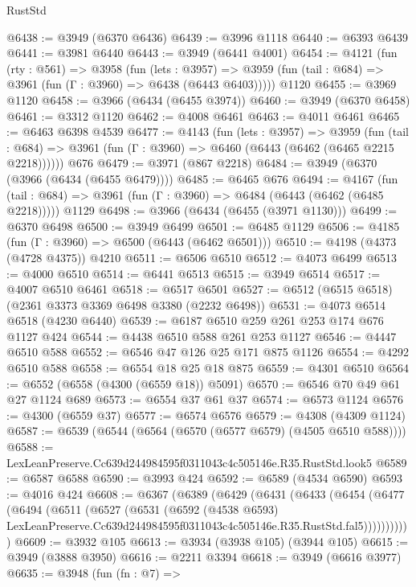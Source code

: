 \begin{lexlean}{RustStd}
\begin{coremodule}
@6438 := @3949 (@6370 @6436)
@6439 := @3996 @1118
@6440 := @6393 @6439
@6441 := @3981 @6440
@6443 := @3949 (@6441 @4001)
@6454 := @4121
    (fun (rty : @561) =>
    @3958
      (fun (lets : @3957) =>
      @3959 (fun (tail : @684) => @3961 (fun (Γ : @3960) => @6438 (@6443 @6403)))))
    @1120
@6455 := @3969 @1120
@6458 := @3966 (@6434 (@6455 @3974))
@6460 := @3949 (@6370 @6458)
@6461 := @3312 @1120
@6462 := @4008 @6461
@6463 := @4011 @6461
@6465 := @6463 @6398 @4539
@6477 := @4143
    (fun (lets : @3957) =>
    @3959
      (fun (tail : @684) => @3961 (fun (Γ : @3960) => @6460 (@6443 (@6462 (@6465 @2215 @2218))))))
    @676
@6479 := @3971 (@867 @2218)
@6484 := @3949 (@6370 (@3966 (@6434 (@6455 @6479))))
@6485 := @6465 @676
@6494 := @4167
    (fun (tail : @684) => @3961 (fun (Γ : @3960) => @6484 (@6443 (@6462 (@6485 @2218)))))
    @1129
@6498 := @3966 (@6434 (@6455 (@3971 @1130)))
@6499 := @6370 @6498
@6500 := @3949 @6499
@6501 := @6485 @1129
@6506 := @4185 (fun (Γ : @3960) => @6500 (@6443 (@6462 @6501)))
@6510 := @4198 (@4373 (@4728 @4375)) @4210
@6511 := @6506 @6510
@6512 := @4073 @6499
@6513 := @4000 @6510
@6514 := @6441 @6513
@6515 := @3949 @6514
@6517 := @4007 @6510 @6461
@6518 := @6517 @6501
@6527 := @6512 (@6515 @6518) (@2361 @3373 @3369 @6498 @3380 (@2232 @6498))
@6531 := @4073 @6514 @6518 (@4230 @6440)
@6539 := @6187 @6510 @259 @261 @253 @174 @676 @1127 @424
@6544 := @4438 @6510 @588 @261 @253 @1127
@6546 := @4447 @6510 @588
@6552 := @6546 @47 @126 @25 @171 @875 @1126
@6554 := @4292 @6510 @588
@6558 := @6554 @18 @25 @18 @875
@6559 := @4301 @6510
@6564 := @6552 (@6558 (@4300 (@6559 @18)) @5091)
@6570 := @6546 @70 @49 @61 @27 @1124 @689
@6573 := @6554 @37 @61 @37
@6574 := @6573 @1124
@6576 := @4300 (@6559 @37)
@6577 := @6574 @6576
@6579 := @4308 (@4309 @1124)
@6587 := @6539 (@6544 (@6564 (@6570 (@6577 @6579) (@4505 @6510 @588))))
@6588 := LexLeanPreserve.Cc639d244984595f0311043c4c505146e.R35.RustStd.look5
@6589 := @6587 @6588
@6590 := @3993 @424
@6592 := @6589 (@4534 @6590)
@6593 := @4016 @424
@6608 := @6367
    (@6389
      (@6429
        (@6431
          (@6433
            (@6454
              (@6477
                (@6494
                  (@6511
                    (@6527
                      (@6531
                        (@6592
                          (@4538 @6593)
                          LexLeanPreserve.Cc639d244984595f0311043c4c505146e.R35.RustStd.fal5)))))))))))
@6609 := @3932 @105
@6613 := @3934 (@3938 @105) (@3944 @105)
@6615 := @3949 (@3888 @3950)
@6616 := @2211 @3394
@6618 := @3949 (@6616 @3977)
@6635 := @3948
    (fun (fn : @7) =>

\end{coremodule}
\end{lexlean}
